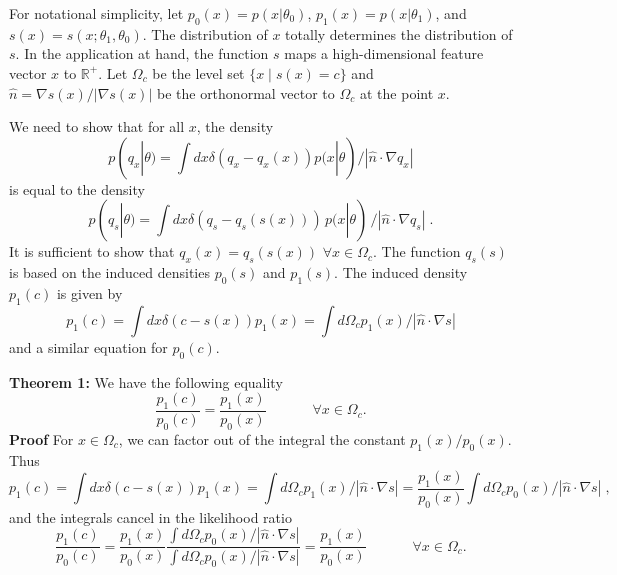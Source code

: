\documentclass[11pt, oneside]{article}   	%
\begin{document}
For notational simplicity, let $p_0(x) = p(x|\theta_0)$, $p_1(x) = p(x|\theta_1)$, and $s(x)=s(x; \theta_1, \theta_0)$.
The distribution of $x$ totally determines the distribution of $s$. 
In the application at hand, the function $s$ maps a high-dimensional feature vector $x$ to $\mathbb{R}^+$.
Let $\Omega_{c}$ be the level set $\{x \mid s(x) = c \}$ and $\hat{n}=\nabla s(x) / |\nabla s(x)|$ be the orthonormal vector to $\Omega_c$ at the point $x$.

We need to show that for all $x$, the density
\begin{equation}
p(q_x|\theta) = \int dx \delta(q_x-q_x(x)) p(x|\theta)  / | \hat{n} \cdot \nabla q_x  | 
\end{equation}
is equal to the density
\begin{equation}
p(q_s|\theta) = \int dx \delta(q_s-q_s(s(x))) \, p(x|\theta) \, / | \hat{n} \cdot \nabla q_s  | \; .
\end{equation}
It is sufficient to show that $q_x(x) = q_s(s(x))$ $ \forall x\in\Omega_c$. The function $q_s(s)$ is based on the induced densities $p_0(s)$ and $p_1(s)$.  The induced density $p_1(c)$ is given by 
\begin{equation}
p_1(c) = \int dx \delta(c-s(x)) p_1(x) = \int d\Omega_c p_1(x)  / | \hat{n} \cdot \nabla s  |
\end{equation}
and a similar equation for $p_0(c)$. 

\textbf{\flushleft Theorem 1:}
We have the following equality
\begin{equation}
\frac{p_1(c)}{p_0(c)} =  \frac{p_1(x)}{p_0(x)}  \;\hspace{3em} \forall x\in\Omega_c.
\end{equation}
\textbf{Proof}
For $x\in \Omega_c$, we can factor out of the integral the constant $p_1(x)/p_0(x)$.
Thus
\begin{equation}
p_1(c) = \int dx \delta(c-s(x)) p_1(x) = \int d\Omega_c p_1(x) / | \hat{n} \cdot \nabla s  |= \frac{p_1(x)}{p_0(x)} \int d\Omega_c p_0(x)  / | \hat{n} \cdot \nabla s  | \;,
\end{equation}
and the integrals cancel in the likelihood ratio
\begin{equation}
\frac{p_1(c)}{p_0(c)} = \frac{p_1(x)}{p_0(x)} \frac{\int d\Omega_c p_0(x)/ | \hat{n} \cdot \nabla s  |}{ \int d\Omega_c p_0(x) / | \hat{n} \cdot \nabla s  |} = \frac{p_1(x)}{p_0(x)}  \;\hspace{3em} \forall x\in\Omega_c.
\end{equation}
\end{document}

